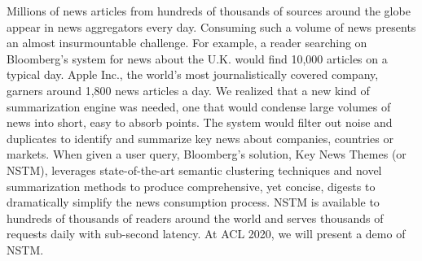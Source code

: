 Millions of news articles from hundreds of thousands of sources around the globe appear in news aggregators every day. Consuming such a volume of news presents an almost insurmountable challenge. For example, a reader searching on Bloomberg's system for news about the U.K. would find 10,000 articles on a typical day. Apple Inc., the world's most journalistically covered company, garners around 1,800 news articles a day. We realized that a new kind of summarization engine was needed, one that would condense large volumes of news into short, easy to absorb points. The system would filter out noise and duplicates to identify and summarize key news about companies, countries or markets. When given a user query, Bloomberg's solution, Key News Themes (or NSTM), leverages state-of-the-art semantic clustering techniques and novel summarization methods to produce comprehensive, yet concise, digests to dramatically simplify the news consumption process. NSTM is available to hundreds of thousands of readers around the world and serves thousands of requests daily with sub-second latency. At ACL 2020, we will present a demo of NSTM.
